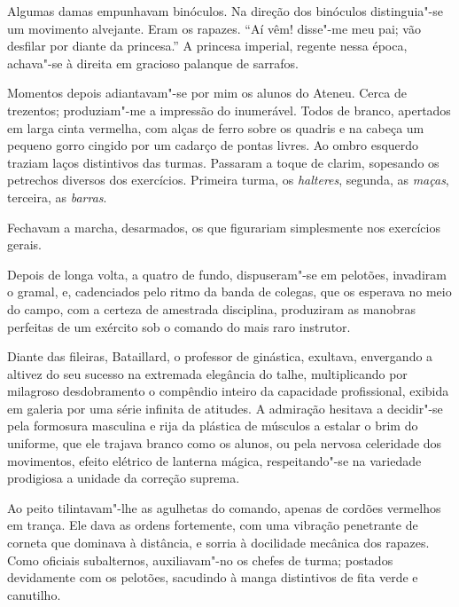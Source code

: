 Algumas damas empunhavam binóculos. Na direção dos binóculos
distinguia"-se um movimento alvejante. Eram os rapazes. ``Aí vêm!
disse"-me meu pai; vão desfilar por diante da princesa.'' A princesa
imperial, regente nessa época, achava"-se à direita em gracioso
palanque de sarrafos. 

Momentos depois adiantavam"-se por mim os alunos
do Ateneu. Cerca de trezentos; produziam"-me a impressão do
inumerável. Todos de branco, apertados em larga cinta vermelha, com
alças de ferro sobre os quadris e na cabeça um pequeno gorro cingido
por um cadarço de pontas livres. Ao ombro esquerdo traziam laços
distintivos das turmas. Passaram a toque de clarim, sopesando os
petrechos diversos dos exercícios. Primeira turma, os \textit{halteres},
segunda, as \textit{maças}, terceira, as \textit{barras}. 

Fechavam a marcha, desarmados,
os que figurariam simplesmente nos exercícios gerais. 

Depois de longa volta, a quatro de fundo, dispuseram"-se em pelotões, invadiram o
gramal, e, cadenciados pelo ritmo da banda de colegas, que os esperava
no meio do campo, com a certeza de amestrada disciplina, produziram as
manobras perfeitas de um exército sob o comando do mais raro instrutor.

Diante das fileiras, Bataillard, o professor de ginástica, exultava,
envergando a altivez do seu sucesso na extremada elegância do talhe,
multiplicando por milagroso desdobramento o compêndio inteiro da
capacidade profissional, exibida em galeria por uma série infinita de
atitudes. A admiração hesitava a decidir"-se pela formosura masculina
e rija da plástica de músculos a estalar o brim do uniforme, que ele
trajava branco como os alunos, ou pela nervosa celeridade dos
movimentos, efeito elétrico de lanterna mágica, respeitando"-se na
variedade prodigiosa a unidade da correção suprema. 

Ao peito tilintavam"-lhe as agulhetas do comando, apenas de cordões vermelhos
em trança. Ele dava as ordens fortemente, com uma vibração penetrante
de corneta que dominava à distância, e sorria à docilidade mecânica dos
rapazes. Como oficiais subalternos, auxiliavam"-no os chefes de turma;
postados devidamente com os pelotões, sacudindo à manga distintivos de
fita verde e canutilho. 

